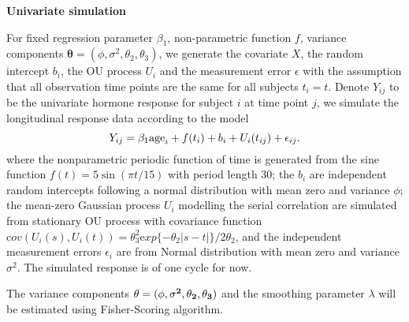 \documentclass[12pt]{article}
\begin{document}
{\large \bf Univariate simulation}

For fixed regression parameter $\beta_1$, non-parametric function $f$, variance components  
$\boldsymbol  \theta = (\phi, \sigma^2, \theta_2, \theta_3)$, 
we generate the covariate $X$, the random intercept $b_i$, the OU process $U_i$ and the measurement error $\epsilon$ with the assumption that all observation time points are the same for all subjects $t_i = t$. 
Denote $Y_{ij}$ to be the univariate hormone response for subject $i$ at time point $j$,  we simulate the longitudinal response data according to the model 
$$
Y_{ij} = \beta_1 {\rm age}_i + f(t_{i}) + b_i + U_i(t_{ij}) + \epsilon_{ij}. 
$$
where the nonparametric periodic function of time is generated from the sine function 
$
f(t) = 5  \sin(\pi t/15)
$
with period length 30;  the $b_i$ are independent random intercepts following a normal distribution with mean zero and variance $\phi$; the mean-zero Gaussian process $U_i$ modelling the serial correlation are simulated from stationary OU process with covariance function ${\mathrm cov}(U_i (s), U_i(t)) = {\theta_3^2 {\mathrm exp}\{-\theta_2|s - t|\} / 2\theta_2}$, and the independent measurement errors $\epsilon_i$ are from Normal distribution with mean zero and variance $\sigma^2$. The simulated response is of one cycle for now.



The variance components $\bf \theta = (\phi, \sigma^2, \theta_2, \theta_3)$ and the smoothing parameter $\lambda$ will be estimated using Fisher-Scoring algorithm. 
\end{document}
